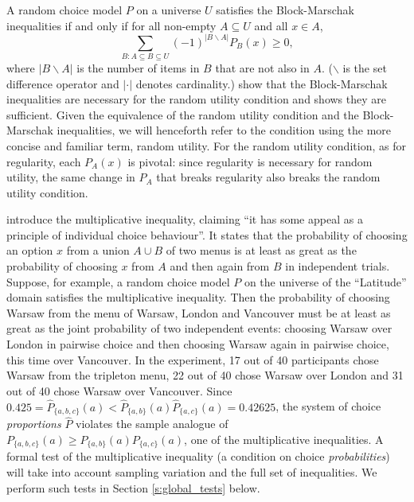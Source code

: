 \documentclass[11pt,letter]{article}
\newcommand{\menu}{menu}
\newcommand{\menus}{menus}
\newcommand{\univ}{U}
\begin{document}
A random choice model $P$ on a universe $\univ$ satisfies the Block-Marschak inequalities if and only if for all non-empty $A \subseteq U$ and all $x \in A$,
	\begin{equation}\label{e:BM}
		\sum_{B \colon A \subseteq B \subseteq U} (-1)^{|B \backslash A|} P_B(x) \geq 0,
	\end{equation}
where $|B\backslash A|$ is the number of items in $B$ that are not also in $A$.
($\backslash$ is the set difference operator and $|\cdot|$ denotes cardinality.)
\citet{BlocMars60} show that the Block-Marschak inequalities are necessary for the random utility condition and \citet{Falm78} shows they are sufficient.
Given the equivalence of the random utility condition and the Block-Marschak inequalities, we will henceforth refer to the condition using the more concise and familiar term, random utility.
For the random utility condition, as for regularity, each $P_A(x)$ is pivotal: since regularity is necessary for random utility, the same change in $P_A$ that breaks regularity also breaks the random utility condition.

\citet{SattTver76} introduce the multiplicative inequality, claiming ``it has some appeal as a principle of individual choice behaviour''.
It states that the probability of choosing an option $x$ from a union $A \cup B$ of two \menus{} is at least as great as the probability of choosing $x$ from $A$ and then again from $B$ in independent trials. 
Suppose, for example, a random choice model $P$ on the universe of the ``Latitude'' domain satisfies the multiplicative inequality.
Then the probability of choosing Warsaw from the \menu{} of Warsaw, London and Vancouver must be at least as great as the joint probability of two independent events: choosing Warsaw over London in pairwise choice and then choosing Warsaw again in pairwise choice, this time over Vancouver.
In the experiment, 17 out of 40 participants chose Warsaw from the tripleton menu, 22 out of 40 chose Warsaw over London and 31 out of 40 chose Warsaw over Vancouver.
Since $0.425 = \hat{P}_{\{a,b,c\}}(a) < \hat{P}_{\{a,b\}}(a) \hat{P}_{\{a,c\}}(a) = 0.42625$, the system of choice {\em proportions} $\hat P$ violates the sample analogue of $P_{\{a,b,c\}}(a) \geq P_{\{a,b\}}(a) P_{\{a,c\}}(a)$, one of the multiplicative inequalities.
A formal test of the multiplicative inequality (a condition on choice {\em probabilities}) will take into account sampling variation and the full set of inequalities.
We perform such tests in Section \ref{s:global_tests} below.
\end{document}
